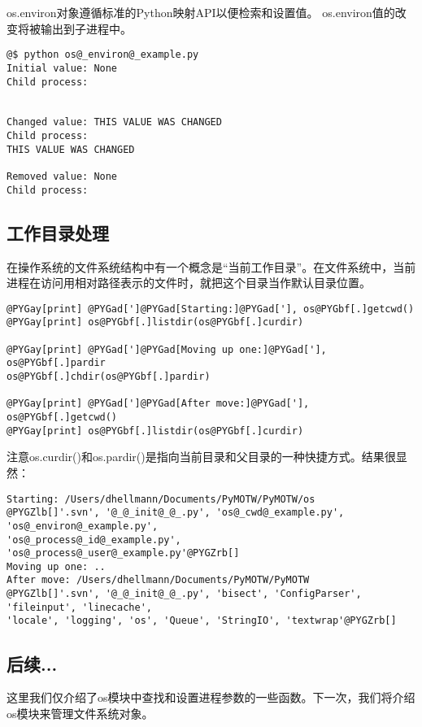 \documentclass[letterpaper,10pt,english]{manual}
\begin{document}
os.environ对象遵循标准的Python映射API以便检索和设置值。 os.environ值的改变将被输出到子进程中。

\begin{Verbatim}[commandchars=@\[\]]
@$ python os@_environ@_example.py
Initial value: None
Child process:


Changed value: THIS VALUE WAS CHANGED
Child process:
THIS VALUE WAS CHANGED

Removed value: None
Child process:
\end{Verbatim}


\subsection{工作目录处理}

在操作系统的文件系统结构中有一个概念是“当前工作目录”。在文件系统中，当前进程在访问用相对路径表示的文件时，就把这个目录当作默认目录位置。

\begin{Verbatim}[commandchars=@\[\]]
@PYGay[print] @PYGad[']@PYGad[Starting:]@PYGad['], os@PYGbf[.]getcwd()
@PYGay[print] os@PYGbf[.]listdir(os@PYGbf[.]curdir)

@PYGay[print] @PYGad[']@PYGad[Moving up one:]@PYGad['], os@PYGbf[.]pardir
os@PYGbf[.]chdir(os@PYGbf[.]pardir)

@PYGay[print] @PYGad[']@PYGad[After move:]@PYGad['], os@PYGbf[.]getcwd()
@PYGay[print] os@PYGbf[.]listdir(os@PYGbf[.]curdir)
\end{Verbatim}

注意os.curdir()和os.pardir()是指向当前目录和父目录的一种快捷方式。结果很显然：

\begin{Verbatim}[commandchars=@\[\]]
Starting: /Users/dhellmann/Documents/PyMOTW/PyMOTW/os
@PYGZlb[]'.svn', '@_@_init@_@_.py', 'os@_cwd@_example.py', 'os@_environ@_example.py',
'os@_process@_id@_example.py', 'os@_process@_user@_example.py'@PYGZrb[]
Moving up one: ..
After move: /Users/dhellmann/Documents/PyMOTW/PyMOTW
@PYGZlb[]'.svn', '@_@_init@_@_.py', 'bisect', 'ConfigParser', 'fileinput', 'linecache',
'locale', 'logging', 'os', 'Queue', 'StringIO', 'textwrap'@PYGZrb[]
\end{Verbatim}


\subsection{后续...}

这里我们仅介绍了os模块中查找和设置进程参数的一些函数。下一次，我们将介绍os模块来管理文件系统对象。
\end{document}
